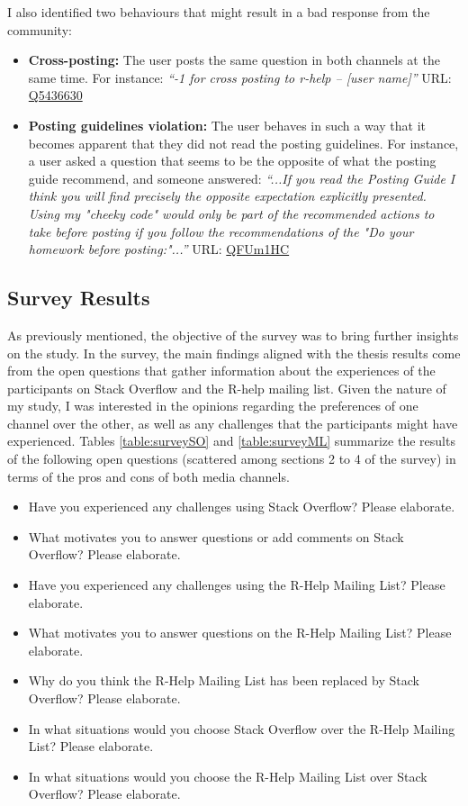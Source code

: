 \documentclass{sig-alternate-05-2015}
\begin{document}
	I also identified two behaviours that might result in a bad response from the community:
	\begin{itemize}
		\item \textbf{Cross-posting:} The user posts the same question in both channels at the same time.
		For instance: \textit{``-1 for cross posting to r-help – [user name]''} {\footnotesize URL: \href{http://goo.gl/ENKrVK}{Q5436630}}
		\item \textbf{Posting guidelines violation:} The user behaves in such a way that it becomes apparent that they did not read the posting guidelines.
		For instance, a user asked a question that seems to be the opposite of what the posting guide recommend, and someone answered: \textit{``...If you read the Posting Guide I think you will find precisely the opposite expectation explicitly presented. Using my "cheeky code" would only be part of the recommended actions to take before posting if you follow the recommendations of the "Do your homework before posting:"...''} {\footnotesize URL: \href{http://goo.gl/FUm1HC}{QFUm1HC}}
	\end{itemize}

\subsection{Survey Results}
\label{sec:survey}

	As previously mentioned, the objective of the survey was to bring further insights on the study.
	In the survey, the main findings aligned with the thesis results come from the open questions that gather information about the experiences of the participants on Stack Overflow and the R-help mailing list.
	Given the nature of my study, I was interested in the opinions regarding the preferences of one channel over the other, as well as any challenges that the participants might have experienced.
	Tables \ref{table:surveySO} and \ref{table:surveyML} summarize the results of the following open questions (scattered among sections 2 to 4 of the survey) in terms of the pros and cons of both media channels.

	{\itshape
	\begin{itemize}
		\item Have you experienced any challenges using Stack Overflow? Please elaborate.
		\item What motivates you to answer questions or add comments on Stack Overflow? Please elaborate.
		\item Have you experienced any challenges using the R-Help Mailing List? Please elaborate.
		\item What motivates you to answer questions on the R-Help Mailing List? Please elaborate.
		\item Why do you think the R-Help Mailing List has been replaced by Stack Overflow? Please elaborate.
		\item In what situations would you choose Stack Overflow over the R-Help Mailing List? Please elaborate.
		\item In what situations would you choose the R-Help Mailing List over Stack Overflow? Please elaborate.
	\end{itemize}
	}
\end{document}
